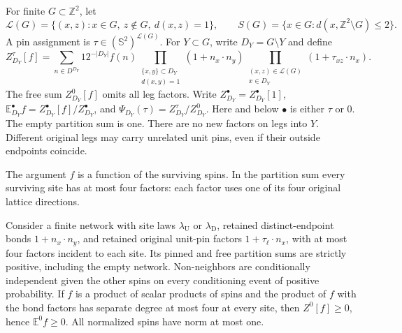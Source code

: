 \begin{definition}\label{d:pinmodel}
For finite \(G\subset\mathbb Z^2\), let
\[
 \mathcal L(G)=\{(x,z):x\in G,\ z\notin G,\ d(x,z)=1\},\qquad
 S(G)=\{x\in G:d(x,\mathbb Z^2\setminus G)\le2\}.
\]
A pin assignment is \(\tau\in(\mathbb S^2)^{\mathcal L(G)}\).
For \(Y\subset G\), write \(D_Y=G\setminus Y\) and define
\[
 Z^\tau_{D_Y}[f]=
 \sum_{n\in D^{D_Y}}12^{-|D_Y|}f(n)
 \prod_{\substack{\{x,y\}\subset D_Y\\d(x,y)=1}}(1+n_x\cdot n_y)
 \prod_{\substack{(x,z)\in\mathcal L(G)\\x\in D_Y}}
       (1+\tau_{xz}\cdot n_x).
\]
The free sum \(Z^0_{D_Y}[f]\) omits all leg factors.
Write \(Z^\bullet_{D_Y}=Z^\bullet_{D_Y}[1]\),
\(\mathbb E^\bullet_{D_Y}f=Z^\bullet_{D_Y}[f]/Z^\bullet_{D_Y}\),
and \(\Psi_{D_Y}(\tau)=Z^\tau_{D_Y}/Z^0_{D_Y}\).
Here and below \(\bullet\) is either \(\tau\) or \(0\).
The empty partition sum is one. There are no new factors on legs into \(Y\).
Different original legs may carry unrelated unit pins, even if their
outside endpoints coincide.
\end{definition}

The argument \(f\) is a function of the surviving spins. In the
partition sum every surviving site has at most four factors: each
factor uses one of its four original lattice directions.

\begin{lemma}\label{l:finitefacts}
Consider a finite network with site laws \(\lambda_{\mathrm U}\) or
\(\lambda_{\mathrm D}\), retained distinct-endpoint bonds
\(1+n_x\cdot n_y\), and retained original unit-pin factors
\(1+\tau_\ell\cdot n_x\), with at most four factors incident to each site.
Its pinned and free partition sums are strictly positive, including
the empty network. Non-neighbors are conditionally independent given
the other spins on every conditioning event of positive probability.
If \(f\) is a product of scalar products of spins and the product of
\(f\) with the bond factors has separate degree at most four at every
site, then \(Z^0[f]\ge0\), hence \(\mathbb E^0 f\ge0\).
All normalized spins have norm at most one.
\end{lemma}

